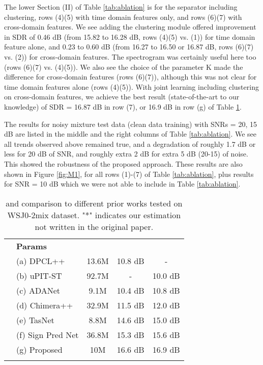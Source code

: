 \documentclass[a4paper]{article}
\begin{document}
The lower Section (II) of Table \ref{tab:ablation} is for the separator including clustering, rows (4)(5) with time domain features only, and rows (6)(7) with cross-domain features. We see adding the clustering module offered improvement in SDR of 0.46 dB (from 15.82 to 16.28 dB, rows (4)(5) vs. (1)) for time domain feature alone, and 0.23 to 0.60 dB (from 16.27 to 16.50 or 16.87 dB, rows (6)(7) vs. (2)) for cross-domain features. The spectrogram was certainly useful here too (rows (6)(7) vs. (4)(5)). We also see the choice of the parameter K made the difference for cross-domain features (rows (6)(7)), although this was not clear for time domain features alone (rows (4)(5)). With joint learning including clustering on cross-domain features, we achieve the best result (state-of-the-art to our knowledge) of SDR = 16.87 dB in row (7), or 16.9 dB in row (g) of Table \ref{tab:performance}.

The results for noisy mixture test data (clean data training) with SNRs = 20, 15 dB are listed in the middle and the right columns of Table \ref{tab:ablation}. We see all trends observed above remained true, and a degradation of roughly 1.7 dB or less for 20 dB of SNR, and roughly extra 2 dB for extra 5 dB (20-15) of noise. This showed the robustness of the proposed approach. These results are also shown in Figure \ref{fig:M1}, for all rows (1)-(7) of Table \ref{tab:ablation}, plus results for SNR = 10 dB which we were not able to include in Table \ref{tab:ablation}.

\begin{table}[t]
  \caption{ and  comparison to different prior works tested on WSJ0-2mix dataset. "*" indicates our estimation not written in the original paper.}
  \label{tab:performance}
  \centering
  \begin{tabular}{|c|l|c|c|c|}
    \Xhline{2\arrayrulewidth}
    \multicolumn{2}{|c|}{\textbf{Approaches}} & \textbf{Params} &  \textbf{} &  \textbf{} \\
    \Xhline{2\arrayrulewidth}
    \multirow{6}{*}{\rotatebox[origin=c]{90}{prior works}}
    & (a) DPCL++ \cite{isik2016single} & 13.6M & 10.8 dB &   -   \\
    & (b) uPIT-ST \cite{kolbaek2017multitalker}& 92.7M &   -  & 10.0 dB \\
    & (c) ADANet \cite{luo2018speaker}&  9.1M & 10.4 dB & 10.8 dB  \\
    & (d) Chimera++ \cite{wang2018alternative}        & 32.9M & 11.5 dB & 12.0 dB \\
    & (e) TasNet \cite{luo2018tasnet}           &  8.8M & 14.6 dB & 15.0 dB \\
    & (f) Sign Pred Net \cite{wang2018deep}  & 36.8M & 15.3 dB & 15.6 dB \\
    \hline
    \multicolumn{1}{|c}{} & (g) Proposed &  10M  & 16.6 dB  & 16.9 dB \\
    \Xhline{2\arrayrulewidth}
  \end{tabular}
\end{table}
\end{document}
